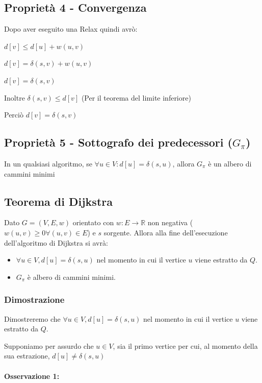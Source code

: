 \documentclass[tikz]{article}
\providecommand{\tightlist}{%
  \setlength{\itemsep}{0pt}\setlength{\parskip}{0pt}}
\let\oldparagraph\paragraph
\renewcommand{\paragraph}[1]{\oldparagraph{#1}\mbox{}}
\begin{document}
{{\subsection{Proprietà 4 - Convergenza}

{Dopo aver eseguito una Relax quindi avrò:}

$d[v] \leq d[u] + w(u,v)$

$d[v] = \delta(s,v) + w(u,v)$

$d[v] = \delta(s,v)$ 

Inoltre $\delta(s,v) \leq d[v]$ (Per il teorema del limite inferiore)

Perciò $d[v]=\delta(s,v)$

\subsection{Proprietà 5 - Sottografo dei predecessori ($G_\pi$)}

{In un qualsiasi algoritmo, se $\forall u \in V: d[u] = \delta(s,u)$, allora $G_\pi$ è un albero di cammini minimi}

\subsection{Teorema di Dijkstra}

{Dato $G=(V,E,w)$ orientato con $w:E\rightarrow \mathbb{R}$ non negativa ($w(u,v) \geq 0 \forall (u,v) \in E$) e $s$ sorgente. Allora alla fine dell'esecuzione dell'algoritmo di Dijkstra si avrà:}

\begin{itemize}
\tightlist
\item
{$\forall u \in V, d[u]=\delta(s,u)$ nel momento in cui il vertice $u$ viene estratto da $Q$.}
\item
{$G_\pi$ è albero di cammini minimi.}
\end{itemize}

\subsubsection{Dimostrazione}

{Dimostreremo che $\forall u \in V, d[u]=\delta(s,u)$ nel momento in cui il vertice $u$ viene estratto da $Q$.}

{Supponiamo per assurdo che $u\in V$, sia il primo vertice per cui, al momento della sua estrazione, $d[u] \neq \delta(s,u)$}

\paragraph{Osservazione 1:}

}}
\end{document}
